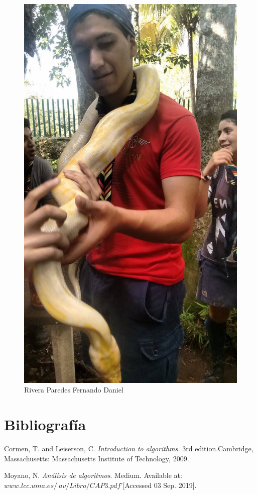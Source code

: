 \documentclass[12pt,twoside]{article}
\begin{document}
\begin{figure}[!h]
\begin{minipage}[t]{10cm}
		\includegraphics[scale=0.2]{Foto2}
		\caption{Rivera Paredes Fernando Daniel}
	\end{minipage}
\end{figure}

\section{Bibliograf\'ia}

\begin{thebibliography}{9}
  Cormen, T. and Leiserson, C.
  \textit{Introduction to algorithms.} 
  3rd edition.Cambridge, Massachusetts: Massachusetts Institute of Technology, 2009.

  Moyano, N.
  \textit{Análisis de algoritmos}.
  Medium. Available at: $www.lcc.uma.es/~av/Libro/CAP3.pdf$'[Accessed 03 Sep. 2019].
\end{thebibliography}
\end{document}
